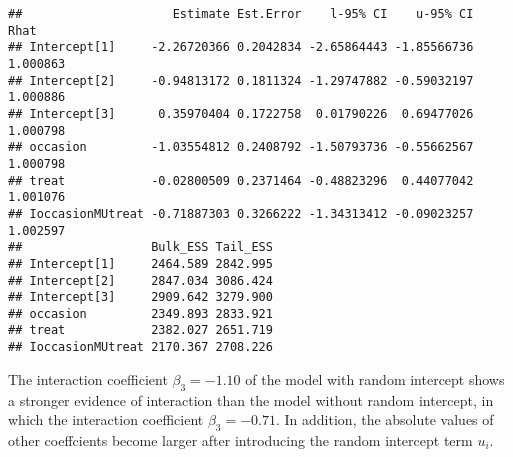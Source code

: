 \documentclass[
]{article}
\begin{document}
\begin{verbatim}
##                     Estimate Est.Error    l-95% CI    u-95% CI     Rhat
## Intercept[1]     -2.26720366 0.2042834 -2.65864443 -1.85566736 1.000863
## Intercept[2]     -0.94813172 0.1811324 -1.29747882 -0.59032197 1.000886
## Intercept[3]      0.35970404 0.1722758  0.01790226  0.69477026 1.000798
## occasion         -1.03554812 0.2408792 -1.50793736 -0.55662567 1.000798
## treat            -0.02800509 0.2371464 -0.48823296  0.44077042 1.001076
## IoccasionMUtreat -0.71887303 0.3266222 -1.34313412 -0.09023257 1.002597
##                  Bulk_ESS Tail_ESS
## Intercept[1]     2464.589 2842.995
## Intercept[2]     2847.034 3086.424
## Intercept[3]     2909.642 3279.900
## occasion         2349.893 2833.921
## treat            2382.027 2651.719
## IoccasionMUtreat 2170.367 2708.226
\end{verbatim}

The interaction coefficient \(\beta_3=-1.10\) of the model with random
intercept shows a stronger evidence of interaction than the model
without random intercept, in which the interaction coefficient
\(\beta_3=-0.71\). In addition, the absolute values of other coeffcients
become larger after introducing the random intercept term \(u_i\).
\end{document}
